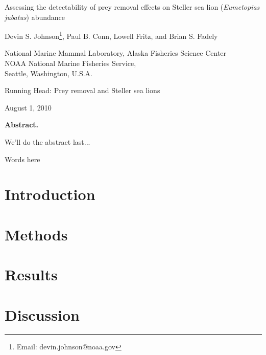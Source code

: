 \documentclass[12pt]{article}
\begin{document}
\renewcommand{\baselinestretch}{1.8}\normalsize

\begin{center}
{\LARGE Assessing the detectability of prey removal effects on Steller sea lion ({\it Eumetopias jubatus}) abundance}\vspace{0.5in}

{\large Devin S. Johnson\footnote[1]{Email: devin.johnson@noaa.gov}, Paul B. Conn, Lowell Fritz, and Brian S. Fadely}

\hrulefill

\renewcommand{\baselinestretch}{1.25}\large
National Marine Mammal Laboratory, Alaska Fisheries Science Center\\
NOAA National Marine Fisheries Service,\\
Seattle, Washington, U.S.A.\\
\hrulefill

\normalsize
{\sc Running Head}: Prey removal and Steller sea lions \bigskip

August 1, 2010
\end{center}


\clearpage

\linenumbers


\centerline{\bf Abstract.} 

We'll do the abstract last...

\noindent \hrulefill

 Words here

\clearpage

\renewcommand{\baselinestretch}{1.8}\normalsize




\section{Introduction}

\citet{Holmes:2007ys}

\section{Methods}

\section{Results}

\section{Discussion}




\end{document}
